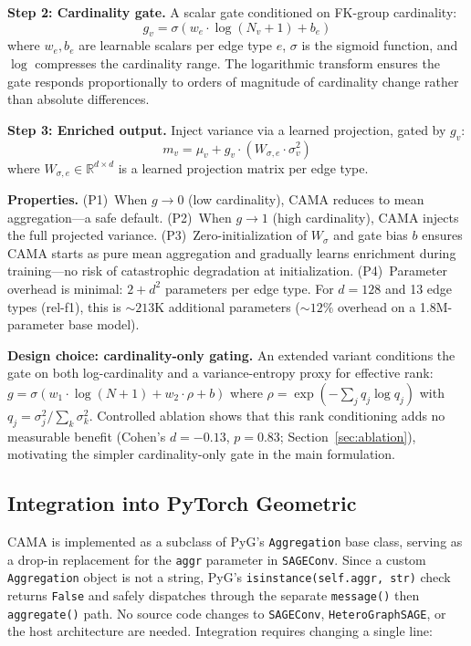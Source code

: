 \documentclass[11pt,letterpaper]{article}
\begin{document}
\textbf{Step 2: Cardinality gate.} A scalar gate conditioned on FK-group cardinality:
\begin{equation}
g_v = \sigma\!\left(w_e \cdot \log(N_v + 1) + b_e\right)
\label{eq:gate}
\end{equation}
where $w_e, b_e$ are learnable scalars per edge type $e$, $\sigma$ is the sigmoid function, and $\log$ compresses the cardinality range. The logarithmic transform ensures the gate responds proportionally to orders of magnitude of cardinality change rather than absolute differences.

\textbf{Step 3: Enriched output.} Inject variance via a learned projection, gated by $g_v$:
\begin{equation}
m_v = \mu_v + g_v \cdot (W_{\sigma,e} \cdot \sigma_v^2)
\label{eq:output}
\end{equation}
where $W_{\sigma,e} \in \mathbb{R}^{d \times d}$ is a learned projection matrix per edge type.

\textbf{Properties.} (P1)~When $g \to 0$ (low cardinality), CAMA reduces to mean aggregation---a safe default. (P2)~When $g \to 1$ (high cardinality), CAMA injects the full projected variance. (P3)~Zero-initialization of $W_\sigma$ and gate bias $b$ ensures CAMA starts as pure mean aggregation and gradually learns enrichment during training---no risk of catastrophic degradation at initialization. (P4)~Parameter overhead is minimal: $2 + d^2$ parameters per edge type. For $d = 128$ and 13 edge types (rel-f1), this is ${\sim}213$K additional parameters (${\sim}12\%$ overhead on a 1.8M-parameter base model).

\textbf{Design choice: cardinality-only gating.} An extended variant conditions the gate on both log-cardinality and a variance-entropy proxy for effective rank: $g = \sigma(w_1 \cdot \log(N{+}1) + w_2 \cdot \rho + b)$ where $\rho = \exp(-\sum_j q_j \log q_j)$ with $q_j = \sigma^2_j / \sum_k \sigma^2_k$. Controlled ablation shows that this rank conditioning adds no measurable benefit (Cohen's $d = -0.13$, $p = 0.83$; Section~\ref{sec:ablation}), motivating the simpler cardinality-only gate in the main formulation.

\subsection{Integration into PyTorch Geometric}
\label{sec:integration}

CAMA is implemented as a subclass of PyG's \texttt{Aggregation} base class, serving as a drop-in replacement for the \texttt{aggr} parameter in \texttt{SAGEConv}. Since a custom \texttt{Aggregation} object is not a string, PyG's \texttt{isinstance(self.aggr, str)} check returns \texttt{False} and safely dispatches through the separate \texttt{message()} then \texttt{aggregate()} path. No source code changes to \texttt{SAGEConv}, \texttt{HeteroGraphSAGE}, or the host architecture are needed. Integration requires changing a single line:
\end{document}
